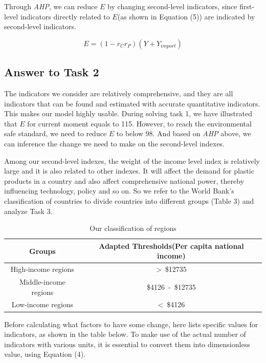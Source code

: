 \documentclass{mcmthesis}
\begin{document}
	  Through \textit{AHP}, we can reduce $E$ by changing second-level indicators, since first-level indicators directly related to $E$(as shown in Equation (5)) are indicated by second-level indicators.

	  \begin{equation}
		    E=(1-r_Cr_P)(Y+Y_{import})
		\end{equation}
	
 \subsection{Answer to Task 2}
	 The indicators we consider are relatively comprehensive, and they are all indicators that can be found and estimated with accurate quantitative indicators. This makes our model highly usable. During solving task 1, we have illustrated that $E$ for current moment equals to 115. However, to reach the environmental safe standard, we need to reduce $E$ to below 98. And based on \textit{AHP} above, we can inference the change we need to make on the second-level indexes.
	 
	 Among our second-level indexes, the weight of the income level index is relatively large and it is also related to other indexes. It will affect the demand for plastic products in a country and also affect comprehensive national power, thereby influencing technology, policy and so on. So we refer to the World Bank's classification of countries to divide countries into different groups (Table 3) and analyze Task 3.
	
	 \begin{table}[H]
	  \renewcommand\arraystretch{1.6}
	  \centering
	   \caption{Our classification of regions}
	 \begin{tabular}{|c|c|}%
        \hline
        Groups&Adapted Thresholds(Per capita national income)\\
        \hline
		High-income regions&>\ \$12735\\
		\hline
        Middle-income regions&\$4126\ -\ \$12735\\
		\hline
		Low-income regions&<\ \$4126\\
        \hline
        \end{tabular}
	\end{table}
	 
	Before calculating what factors to have some change, here lists specific values for indicators, as shown in the table below. To make use of the actual number of indicators with various units, it is essential to convert them into dimensionless value, using Equation (4).
\end{document}
